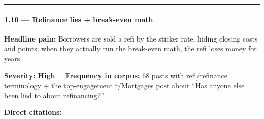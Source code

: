\documentclass[
  10pt,
]{article}
\begin{document}
\begin{center}\rule{0.5\linewidth}{0.5pt}\end{center}

\hypertarget{refinance-lies-break-even-math}{%
\paragraph{1.10 --- Refinance lies + break-even math}\label{refinance-lies-break-even-math}}

\textbf{Headline pain:} Borrowers are sold a refi by the sticker rate, hiding closing costs and
points; when they actually run the break-even math, the refi loses money for years.

\textbf{Severity:} \textbf{High} · \textbf{Frequency in corpus:} 68 posts with refi/refinance
terminology + the top-engagement r/Mortgages post about ``Has anyone else been lied to about
refinancing?''

\textbf{Direct citations:}
\end{document}
